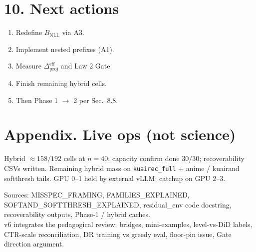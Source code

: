 \documentclass[11pt]{article}
\newcommand{\phonesection}[1]{\Needspace{8\baselineskip}\section*{#1}}
\newcommand{\Dprojeff}{\Delta_{\mathrm{proj}}^{\mathrm{eff}}}
\begin{document}
\phonesection{10. Next actions}

\begin{enumerate}
  \item Redefine $B_{\mathrm{NLL}}$ via A3.
  \item Implement nested prefixes (A1).
  \item Measure $\Dprojeff$ and Law 2 Gate.
  \item Finish remaining hybrid cells.
  \item Then Phase 1 $\to$ 2 per Sec.~8.8.
\end{enumerate}

\phonesection{Appendix. Live ops (not science)}

{\footnotesize
Hybrid $\approx 158/192$ cells at $n{=}40$;
capacity confirm done $30/30$; recoverability
CSVs written.  Remaining hybrid mass on
\texttt{kuairec\_full} + anime / kuairand
softthresh tails.  GPU 0--1 held by external
vLLM; catchup on GPU 2--3.\par
}

\vspace{0.4em}
{\footnotesize\raggedright
Sources: MISSPEC\_FRAMING, FAMILIES\_EXPLAINED,
SOFTAND\_SOFTTHRESH\_EXPLAINED, residual\_env
code docstring, recoverability outputs,
Phase-1 / hybrid caches.\\
v6 integrates the pedagogical review:
bridges, mini-examples, level-vs-DiD labels,
CTR-scale reconciliation, DR training vs
greedy eval, floor-pin issue, Gate
direction argument.\par
}
\end{document}
